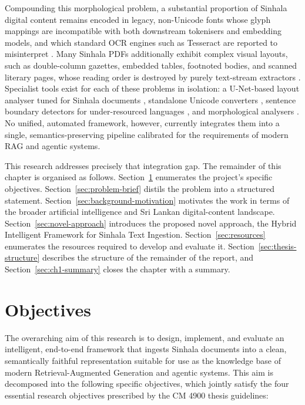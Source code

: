 \documentclass[12pt,a4paper,oneside]{report}
\begin{document}
Compounding this morphological problem, a substantial proportion of Sinhala digital content remains encoded in legacy, non-Unicode fonts whose glyph mappings are incompatible with both downstream tokenisers and embedding models, and which standard OCR engines such as Tesseract \cite{smith2007tesseract} are reported to misinterpret \cite{herath2021sinhala}. Many Sinhala PDFs additionally exhibit complex visual layouts, such as double-column gazettes, embedded tables, footnoted bodies, and scanned literary pages, whose reading order is destroyed by purely text-stream extractors \cite{unstract2024pdfhell}. Specialist tools exist for each of these problems in isolation: a U-Net-based layout analyser tuned for Sinhala documents \cite{wickramasinghe2024unet}, standalone Unicode converters \cite{webapps2025converter}, sentence boundary detectors for under-resourced languages \cite{ruwanpathirana2015sentence}, and morphological analysers \cite{pathirana2025sinmorphy}. No unified, automated framework, however, currently integrates them into a single, semantics-preserving pipeline calibrated for the requirements of modern RAG and agentic systems.

This research addresses precisely that integration gap. The remainder of this chapter is organised as follows. Section~\ref{sec:objectives} enumerates the project's specific objectives. Section~\ref{sec:problem-brief} distils the problem into a structured statement. Section~\ref{sec:background-motivation} motivates the work in terms of the broader artificial intelligence and Sri Lankan digital-content landscape. Section~\ref{sec:novel-approach} introduces the proposed novel approach, the Hybrid Intelligent Framework for Sinhala Text Ingestion. Section~\ref{sec:resources} enumerates the resources required to develop and evaluate it. Section~\ref{sec:thesis-structure} describes the structure of the remainder of the report, and Section~\ref{sec:ch1-summary} closes the chapter with a summary.

\section{Objectives}
\label{sec:objectives}
The overarching aim of this research is to design, implement, and evaluate an intelligent, end-to-end framework that ingests Sinhala documents into a clean, semantically faithful representation suitable for use as the knowledge base of modern Retrieval-Augmented Generation and agentic systems. This aim is decomposed into the following specific objectives, which jointly satisfy the four essential research objectives prescribed by the CM 4900 thesis guidelines:
\end{document}
